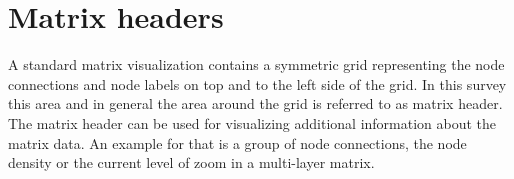 %
%
% 
% 
% 


\chapter{Matrix headers}\label{chap:headers}

A standard matrix visualization contains a symmetric grid representing the node connections and node labels on top and to the left side of the grid. In this survey this area and in general the area around the grid is referred to as matrix header. The matrix header can be used for visualizing additional information about the matrix data. An example for that is a group of node connections, the node density or the current level of zoom in a multi-layer matrix.


